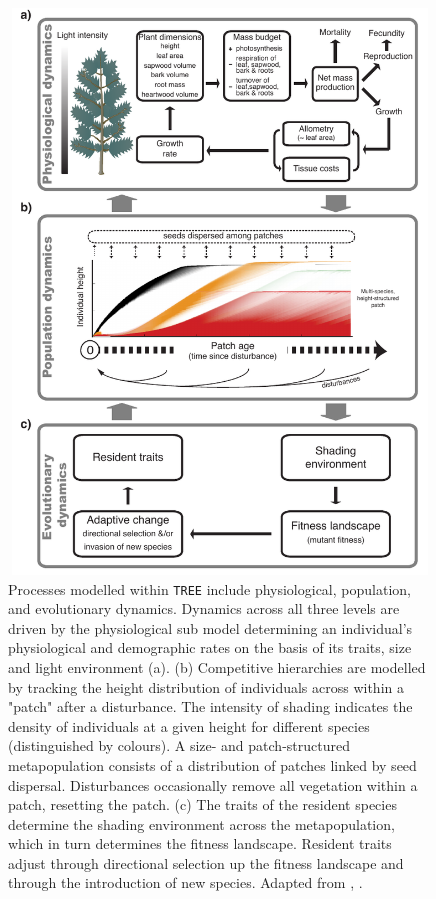 \documentclass[a4paper,11pt]{article}
\begin{document}
\begin{figure}[h!]
\centering
\includegraphics[width=15cm,height=15cm,keepaspectratio]{output/schematic}

\caption{Processes modelled within \texttt{TREE} include physiological, population, and
evolutionary dynamics.
Dynamics across all three levels are driven by the
physiological sub model determining an individual's physiological and
demographic rates on the basis of its traits, size and light environment (a).
(b) Competitive hierarchies  are modelled by tracking the height distribution of
individuals across within a "patch" after a disturbance. The intensity
of shading indicates the density of individuals at a given height for
different species (distinguished by colours). A size- and patch-structured
metapopulation consists of a distribution of patches linked by seed dispersal.
Disturbances occasionally remove all vegetation within a patch, resetting the
patch. (c) The traits of the resident species determine the shading environment
across the metapopulation, which in turn determines the fitness landscape.
Resident traits adjust through directional selection up the fitness landscape
and through the introduction of new species. Adapted from
\citet{Falster-2011}, \citet{Falster-2015}. }

\label{fig:schematic}
\end{figure}
\end{document}
